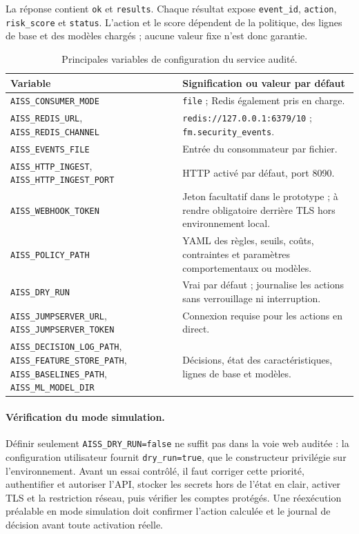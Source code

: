 \documentclass[11pt,a4paper,oneside]{report}
\theoremstyle{definition}
\theoremstyle{plain}
\begin{document}
La réponse contient \texttt{ok} et \texttt{results}. Chaque résultat expose
\texttt{event\_id}, \texttt{action}, \texttt{risk\_score} et
\texttt{status}. L'action et le score dépendent de la politique, des lignes de
base et des modèles chargés ; aucune valeur fixe n'est donc garantie.

\begin{table}[H]
\centering
\caption{Principales variables de configuration du service audité.}
\label{tab:app-config}
\small
\begin{tabular}{@{}p{}p{}@{}}
\toprule
Variable & Signification ou valeur par défaut \\
\midrule
\texttt{AISS\_CONSUMER\_MODE} & \texttt{file} ; Redis également pris en charge. \\
\texttt{AISS\_REDIS\_URL}, \texttt{AISS\_REDIS\_CHANNEL} &
\texttt{redis://127.0.0.1:6379/10} ; \texttt{fm.security\_events}. \\
\texttt{AISS\_EVENTS\_FILE} & Entrée du consommateur par fichier. \\
\texttt{AISS\_HTTP\_INGEST}, \texttt{AISS\_HTTP\_INGEST\_PORT} &
HTTP activé par défaut, port 8090. \\
\texttt{AISS\_WEBHOOK\_TOKEN} & Jeton facultatif dans le prototype ; à rendre
obligatoire derrière TLS hors environnement local. \\
\texttt{AISS\_POLICY\_PATH} & YAML des règles, seuils, coûts, contraintes et
paramètres comportementaux ou modèles. \\
\texttt{AISS\_DRY\_RUN} & Vrai par défaut ; journalise les actions sans
verrouillage ni interruption. \\
\texttt{AISS\_JUMPSERVER\_URL}, \texttt{AISS\_JUMPSERVER\_TOKEN} &
Connexion requise pour les actions en direct. \\
\texttt{AISS\_DECISION\_LOG\_PATH}, \texttt{AISS\_FEATURE\_STORE\_PATH},
\texttt{AISS\_BASELINES\_PATH}, \texttt{AISS\_ML\_MODEL\_DIR} &
Décisions, état des caractéristiques, lignes de base et modèles. \\
\bottomrule
\end{tabular}
\end{table}

\paragraph{Vérification du mode simulation.}
Définir seulement \texttt{AISS\_DRY\_RUN=false} ne suffit pas dans la voie web
auditée : la configuration utilisateur fournit \texttt{dry\_run=true}, que le
constructeur privilégie sur l'environnement. Avant un essai contrôlé, il faut
corriger cette priorité, authentifier et autoriser l'API, stocker les secrets
hors de l'état en clair, activer TLS et la restriction réseau, puis vérifier les
comptes protégés. Une réexécution préalable en mode simulation doit confirmer
l'action calculée et le journal de décision avant toute activation réelle.
\end{document}
